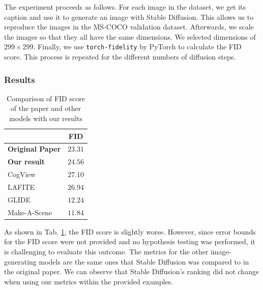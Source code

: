 \documentclass[11pt]{article}
\begin{document}
The experiment proceeds as follows. For each image in the dataset, we get its caption and use it to generate an image with Stable Diffusion. This allows us to reproduce the images in the MS-COCO validation dataset. Afterwards, we scale the images so that they all have the same dimensions. We selected dimensions of $299\times299$. Finally, we use \texttt{torch-fidelity}\cite{obukhov2020torchfidelity} by PyTorch to calculate the FID score. This process is repeated for the different numbers of diffusion steps.

\subsubsection{Results}
\begin{table}[hbp]
    \centering
    \caption{Comparison of FID score of the paper and other models with our results}
    \label{tab:fid_is_comparison}
    \begin{tabular}{lc}
        \toprule
                                                                               & \textbf{FID} \\
        \midrule
        \textbf{Original Paper}                                                & $23.31$      \\
        \textbf{Our result}                                                    & $24.56$      \\\addlinespace
        CogView \cite{ding2021cogviewmasteringtexttoimagegeneration}           & $27.10$      \\
        LAFITE \cite{zhou2022lafitelanguagefreetrainingtexttoimage}            & $26.94$      \\
        GLIDE \cite{rezende2014stochasticbackpropagationapproximateinference}  & $12.24$      \\
        Make-A-Scene \cite{gafni2022makeascenescenebasedtexttoimagegeneration} & $11.84$      \\
        \bottomrule
    \end{tabular}
\end{table}

As shown in Tab. \ref{tab:fid_is_comparison}, the FID score is slightly worse. However, since error bounds for the FID score were not provided and no hypothesis testing was performed, it is challenging to evaluate this outcome. The metrics for the other image-generating models are the same ones that Stable Diffusion was compared to in the original paper. We can observe that Stable Diffusion's ranking did not change when using our metrics within the provided examples.
\end{document}
